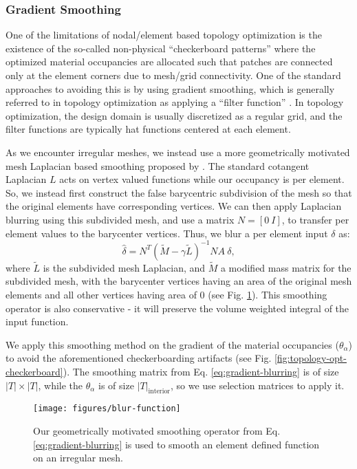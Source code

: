 \subsubsection{Gradient Smoothing}
One of the limitations of nodal/element based topology optimization is the existence of the so-called non-physical ``checkerboard patterns'' where the optimized material occupancies are allocated such that patches are connected only at the element corners due to mesh/grid connectivity. One of the standard approaches to avoiding this is by using gradient smoothing, which is generally referred to in topology optimization as applying a ``filter function'' \cite{top-opt-filters}. In topology optimization, the design domain is usually discretized as a regular grid, and the filter functions are typically hat functions centered at each element. 

As we encounter irregular meshes, we instead use a more geometrically motivated mesh Laplacian based smoothing proposed by \citet{alec-blurring}. %
The standard cotangent Laplacian $L$ acts on vertex valued functions while our occupancy is per element. So, we instead first construct the false barycentric subdivision of the mesh so that the original elements have corresponding vertices. We can then apply Laplacian blurring using this subdivided mesh, and use a matrix $N = [0\ I]$, to transfer per element values to the barycenter vertices. Thus, we blur a per element input $\delta$ as:
\begin{equation}
\label{eq:gradient-blurring}
	\hat{\delta} = N^T (\tilde{M} - \gamma \tilde{L})^{-1} N A\  \delta, 
\end{equation}
where $\tilde{L}$ is the subdivided mesh Laplacian, and $\tilde{M}$ a modified mass matrix for the subdivided mesh, with the barycenter vertices having an area of the original mesh elements and all other vertices having area of 0 (see Fig. \ref{fig:smooth-function}). This smoothing operator is also conservative - it will preserve the volume weighted integral of the input function.

We apply this smoothing method on the gradient of the material occupancies ($\theta_\alpha$) to avoid the aforementioned checkerboarding artifacts (see Fig. \ref{fig:topology-opt-checkerboard}). The smoothing matrix from Eq. \ref{eq:gradient-blurring} is of size $| T | \times | T|$, while the $\theta_\alpha$ is of size $| T |_\text{interior}$, so we use selection matrices to apply it. 
\begin{figure}[t]
	\texttt{[image: figures/blur-function]}
	\vspace{-0.7cm}
	\caption{Our geometrically motivated smoothing operator from Eq. \ref{eq:gradient-blurring} is used to smooth an element defined function on an irregular mesh.}
	\label{fig:smooth-function}
\end{figure}

